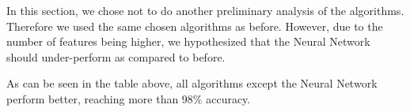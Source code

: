 In this section, we chose not to do another preliminary analysis of the algorithms. Therefore we used the same chosen algorithms as before. However, due to the number of features being higher, we hypothesized that the Neural Network should under-perform as compared to before. 
\begin{table}[!h]

    \vspace{0.2cm}
    \caption{Accuracy of the 4 selected algorithms on 4FG associated data.}
    \label{tab:selected_algs2}
\end{table}

As can be seen in the table above, all algorithms except the Neural Network perform better, reaching more than 98\% accuracy. 